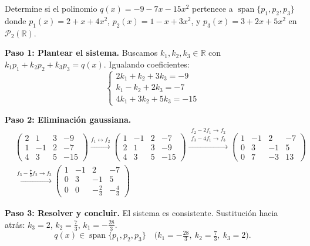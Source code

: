 \begin{example}
Determine si el polinomio $q(x) = -9 - 7x - 15x^2$ pertenece a $\operatorname{span}\{p_1, p_2, p_3\}$ donde $p_1(x) = 2 + x + 4x^2$, $p_2(x) = 1 - x + 3x^2$, y $p_3(x) = 3 + 2x + 5x^2$ en $\mathcal{P}_2(\mathbb{R})$.

\begin{myproof}
\textbf{Paso 1: Plantear el sistema.} Buscamos $k_1, k_2, k_3\in\mathbb{R}$ con $k_1p_1+k_2p_2+k_3p_3=q(x)$. Igualando coeficientes:
\[
\begin{cases}
2k_1 + k_2 + 3k_3 = -9 \\
k_1 - k_2 + 2k_3 = -7 \\
4k_1 + 3k_2 + 5k_3 = -15
\end{cases}
\]

\textbf{Paso 2: Eliminación gaussiana.}
\begin{align*}
&\left(\begin{array}{ccc|c}2 & 1 & 3 & -9 \\1 & -1 & 2 & -7 \\4 & 3 & 5 & -15\end{array}\right)
\xrightarrow{f_1 \leftrightarrow f_2}
\left(\begin{array}{ccc|c}1 & -1 & 2 & -7 \\2 & 1 & 3 & -9 \\4 & 3 & 5 & -15\end{array}\right)
\xrightarrow{\substack{f_2 - 2f_1\to f_2 \\ f_3 - 4f_1\to f_3}}
\left(\begin{array}{ccc|c}1 & -1 & 2 & -7 \\0 & 3 & -1 & 5 \\0 & 7 & -3 & 13\end{array}\right) \\
&\xrightarrow{f_3 - \frac{7}{3}f_2\to f_3}
\left(\begin{array}{ccc|c}1 & -1 & 2 & -7 \\0 & 3 & -1 & 5 \\0 & 0 & -\frac{2}{3} & -\frac{4}{3}\end{array}\right)
\end{align*}

\textbf{Paso 3: Resolver y concluir.} El sistema es consistente. Sustitución hacia atrás:
$k_3=2$, $k_2=\tfrac{7}{3}$, $k_1=-\tfrac{28}{3}$.
$$\boxed{q(x)\in\operatorname{span}\{p_1,p_2,p_3\} \quad \bigl(k_1=-\tfrac{28}{3},\ k_2=\tfrac{7}{3},\ k_3=2\bigr).}$$
\end{myproof}
\end{example}

